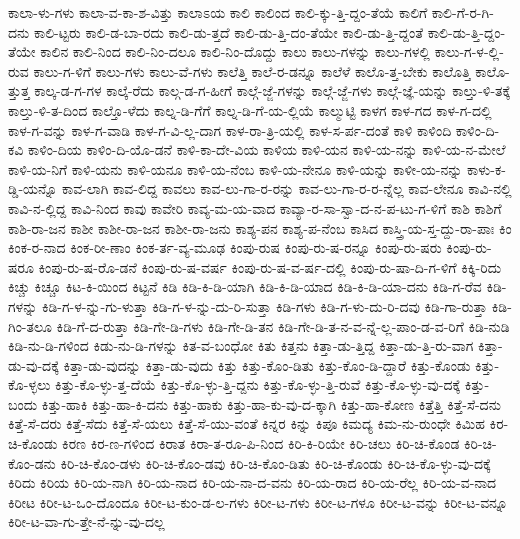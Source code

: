 {ಕಾಲಾ-ಳು-ಗಳು
ಕಾಲಾ-ವ-ಕಾ-ಶ-ವಿತ್ತು
ಕಾಲಾಽಯ
ಕಾಲಿ
ಕಾಲಿಂದ
ಕಾಲಿ-ಕ್ಕು-ತ್ತಿ-ದ್ದಂ-ತೆಯೆ
ಕಾಲಿಗೆ
ಕಾಲಿ-ಗೆ-ರ-ಗಿ-ದನು
ಕಾಲಿ-ಟ್ಟರು
ಕಾಲಿ-ಡ-ಬಾ-ರದು
ಕಾಲಿ-ಡು-ತ್ತದೆ
ಕಾಲಿ-ಡು-ತ್ತಿ-ದಂ-ತೆಯೇ
ಕಾಲಿ-ಡು-ತ್ತಿ-ದ್ದಂತೆ
ಕಾಲಿ-ಡು-ತ್ತಿ-ದ್ದಂ-ತೆಯೇ
ಕಾಲಿನ
ಕಾಲಿ-ನಿಂದ
ಕಾಲಿ-ನಿಂ-ದಲೂ
ಕಾಲಿ-ನಿಂ-ದೊದ್ದು
ಕಾಲು
ಕಾಲು-ಗಳನ್ನು
ಕಾಲು-ಗಳಲ್ಲಿ
ಕಾಲು-ಗ-ಳ-ಲ್ಲಿ-ರುವ
ಕಾಲು-ಗ-ಳಿಗೆ
ಕಾಲು-ಗಳು
ಕಾಲು-ವೆ-ಗಳು
ಕಾಲೆತ್ತಿ
ಕಾಲೆ-ರ-ಡನ್ನೂ
ಕಾಲೆಳೆ
ಕಾಲೊ-ತ್ತ-ಬೇಕು
ಕಾಲೊತ್ತಿ
ಕಾಲೊ-ತ್ತುತ್ತ
ಕಾಲ್ಕ-ಡ-ಗ-ಗಳ
ಕಾಲ್ಕೆ-ರೆದು
ಕಾಲ್ಗ-ಡ-ಗ-ಹೀಗೆ
ಕಾಲ್ಗೆ-ಜ್ಜೆ-ಗಳನ್ನು
ಕಾಲ್ಗೆ-ಜ್ಜೆ-ಗಳು
ಕಾಲ್ಗೆ-ಜ್ಞೆ-ಯನ್ನು
ಕಾಲ್ತು-ಳಿ-ತಕ್ಕೆ
ಕಾಲ್ತು-ಳಿ-ತ-ದಿಂದ
ಕಾಲ್ತೊ-ಳೆದು
ಕಾಲ್ನ-ಡಿ-ಗೆಗೆ
ಕಾಲ್ನ-ಡಿ-ಗೆ-ಯ-ಲ್ಲಿಯೆ
ಕಾಲ್ಮುಟ್ಟಿ
ಕಾಳಗ
ಕಾಳ-ಗದ
ಕಾಳ-ಗ-ದಲ್ಲಿ
ಕಾಳ-ಗ-ವನ್ನು
ಕಾಳ-ಗ-ವಾಡಿ
ಕಾಳ-ಗ-ವಿ-ಲ್ಲ-ದಾಗ
ಕಾಳ-ರಾ-ತ್ರಿ-ಯಲ್ಲಿ
ಕಾಳ-ಸ-ರ್ಪ-ದಂತೆ
ಕಾಳಿ
ಕಾಳಿಂದಿ
ಕಾಳಿಂ-ದಿ-ಕವಿ
ಕಾಳಿಂ-ದಿಯ
ಕಾಳಿಂ-ದಿ-ಯೊ-ಡನೆ
ಕಾಳಿ-ಕಾ-ದೇ-ವಿಯ
ಕಾಳಿಯ
ಕಾಳಿ-ಯನ
ಕಾಳಿ-ಯ-ನನ್ನು
ಕಾಳಿ-ಯ-ನ-ಮೇಲೆ
ಕಾಳಿ-ಯ-ನಿಗೆ
ಕಾಳಿ-ಯನು
ಕಾಳಿ-ಯನೂ
ಕಾಳಿ-ಯ-ನೆಂಬ
ಕಾಳಿ-ಯ-ನೇನೂ
ಕಾಳಿ-ಯನ್ನು
ಕಾಳೀ-ಯ-ನನ್ನು
ಕಾಳು-ಕ-ಡ್ಡಿ-ಯನ್ನೊ
ಕಾವ-ಲಾಗಿ
ಕಾವ-ಲಿದ್ದ
ಕಾವಲು
ಕಾವ-ಲು-ಗಾ-ರ-ರನ್ನು
ಕಾವ-ಲು-ಗಾ-ರ-ರ-ನ್ನೆಲ್ಲ
ಕಾವ-ಲೇನೂ
ಕಾವಿ-ನಲ್ಲಿ
ಕಾವಿ-ನ-ಲ್ಲಿದ್ದ
ಕಾವಿ-ನಿಂದ
ಕಾವು
ಕಾವೇರಿ
ಕಾವ್ಯ-ಮ-ಯ-ವಾದ
ಕಾವ್ಯಾ-ರ-ಸಾ-ಸ್ವಾ-ದ-ನ-ಪ-ಟು-ಗ-ಳಿಗೆ
ಕಾಶಿ
ಕಾಶಿಗೆ
ಕಾಶಿ-ರಾ-ಜನ
ಕಾಶೀ
ಕಾಶೀ-ರಾ-ಜನ
ಕಾಶೀ-ರಾ-ಜನು
ಕಾಶ್ಯ-ಪನ
ಕಾಶ್ಯ-ಪ-ನೆಂಬ
ಕಾಸಿದ
ಕಾಸ್ತ್ರಿ-ಯ-ಸ್ತ-ದ್ದು-ರಾ-ಪಾಃ
ಕಿಂ
ಕಿಂಕ-ರ-ನಾದ
ಕಿಂಕ-ರೀ-ಣಾಂ
ಕಿಂಕ-ರ್ತ-ವ್ಯ-ಮೂಢ
ಕಿಂಪು-ರುಷ
ಕಿಂಪು-ರು-ಷ-ರನ್ನೂ
ಕಿಂಪು-ರು-ಷರು
ಕಿಂಪು-ರು-ಷರೂ
ಕಿಂಪು-ರು-ಷ-ರೊ-ಡನೆ
ಕಿಂಪು-ರು-ಷ-ವರ್ಷ
ಕಿಂಪು-ರು-ಷ-ವ-ರ್ಷ-ದಲ್ಲಿ
ಕಿಂಪು-ರು-ಷಾ-ದಿ-ಗ-ಳಿಗೆ
ಕಿಕ್ಕಿ-ರಿದು
ಕಿಚ್ಚು
ಕಿಚ್ಚೂ
ಕಿಟ-ಕಿ-ಯಿಂದ
ಕಿಟ್ಟನೆ
ಕಿಡಿ
ಕಿಡಿ-ಕಿ-ಡಿ-ಯಾಗಿ
ಕಿಡಿ-ಕಿ-ಡಿ-ಯಾದ
ಕಿಡಿ-ಕಿ-ಡಿ-ಯಾ-ದನು
ಕಿಡಿ-ಗ-ರೆವ
ಕಿಡಿ-ಗಳನ್ನು
ಕಿಡಿ-ಗ-ಳ-ನ್ನು-ಗು-ಳುತ್ತಾ
ಕಿಡಿ-ಗ-ಳ-ನ್ನು-ದು-ರಿ-ಸುತ್ತಾ
ಕಿಡಿ-ಗಳು
ಕಿಡಿ-ಗ-ಳು-ದು-ರಿ-ದವು
ಕಿಡಿ-ಗಾ-ರುತ್ತಾ
ಕಿಡಿ-ಗಿಂ-ತಲೂ
ಕಿಡಿ-ಗೆ-ದ-ರುತ್ತಾ
ಕಿಡಿ-ಗೇ-ಡಿ-ಗಳು
ಕಿಡಿ-ಗೇ-ಡಿ-ತನ
ಕಿಡಿ-ಗೇ-ಡಿ-ತ-ನ-ವ-ನ್ನೆ-ಲ್ಲ-ಪಾಂ-ಡ-ವ-ರಿಗೆ
ಕಿಡಿ-ನುಡಿ
ಕಿಡಿ-ನು-ಡಿ-ಗಳಿಂದ
ಕಿಡು-ನು-ಡಿ-ಗಳನ್ನು
ಕಿತ-ವ-ಬಂಧೋ
ಕಿತು
ಕಿತ್ತನು
ಕಿತ್ತಾ-ಡು-ತ್ತಿದ್ದ
ಕಿತ್ತಾ-ಡು-ತ್ತಿ-ರು-ವಾಗ
ಕಿತ್ತಾ-ಡು-ವು-ದಕ್ಕೆ
ಕಿತ್ತಾ-ಡು-ವುದನ್ನು
ಕಿತ್ತಾ-ಡು-ವುದು
ಕಿತ್ತು
ಕಿತ್ತು-ಕೊಂ-ಡಿತು
ಕಿತ್ತು-ಕೊಂ-ಡಿ-ದ್ದಾರೆ
ಕಿತ್ತು-ಕೊಂಡು
ಕಿತ್ತು-ಕೊ-ಳ್ಳಲು
ಕಿತ್ತು-ಕೊ-ಳ್ಳು-ತ್ತ-ದೆಯೆ
ಕಿತ್ತು-ಕೊ-ಳ್ಳು-ತ್ತಿ-ದ್ದನು
ಕಿತ್ತು-ಕೊ-ಳ್ಳು-ತ್ತಿ-ರುವೆ
ಕಿತ್ತು-ಕೊ-ಳ್ಳು-ವು-ದಕ್ಕೆ
ಕಿತ್ತು-ಬಂದು
ಕಿತ್ತು-ಹಾಕಿ
ಕಿತ್ತು-ಹಾ-ಕಿ-ದನು
ಕಿತ್ತು-ಹಾಕು
ಕಿತ್ತು-ಹಾ-ಕು-ವು-ದ-ಕ್ಕಾಗಿ
ಕಿತ್ತು-ಹಾ-ಕೋಣ
ಕಿತ್ತೆತ್ತಿ
ಕಿತ್ತೆ-ಸೆ-ದನು
ಕಿತ್ತೆ-ಸೆ-ದರು
ಕಿತ್ತೆ-ಸೆದು
ಕಿತ್ತೆ-ಸೆ-ಯಲು
ಕಿತ್ತೆ-ಸೆ-ಯು-ವಂತೆ
ಕಿನ್ನರ
ಕಿನ್ನು
ಕಿಪೂ
ಕಿಮದ್ಯ
ಕಿಮ-ನು-ರುಂಧೇ
ಕಿಮಿಹ
ಕಿರ-ಚಿ-ಕೊಂಡು
ಕಿರಣ
ಕಿರ-ಣ-ಗಳಿಂದ
ಕಿರಾತ
ಕಿರಾ-ತ-ರೂ-ಪಿ-ನಿಂದ
ಕಿರಿ-ಕಿ-ರಿಯೇ
ಕಿರಿ-ಚಲು
ಕಿರಿ-ಚಿ-ಕೊಂಡ
ಕಿರಿ-ಚಿ-ಕೊಂ-ಡನು
ಕಿರಿ-ಚಿ-ಕೊಂ-ಡಳು
ಕಿರಿ-ಚಿ-ಕೊಂ-ಡವು
ಕಿರಿ-ಚಿ-ಕೊಂ-ಡಿತು
ಕಿರಿ-ಚಿ-ಕೊಂಡು
ಕಿರಿ-ಚಿ-ಕೊ-ಳ್ಳು-ವು-ದಕ್ಕೆ
ಕಿರಿದು
ಕಿರಿಯ
ಕಿರಿ-ಯ-ನಾಗಿ
ಕಿರಿ-ಯ-ನಾದ
ಕಿರಿ-ಯ-ನಾ-ದ-ವನು
ಕಿರಿ-ಯ-ರಾದ
ಕಿರಿ-ಯ-ರೆಲ್ಲ
ಕಿರಿ-ಯ-ವ-ನಾದ
ಕಿರೀಟ
ಕಿರೀ-ಟ-ಒಂ-ದೊಂದೂ
ಕಿರೀ-ಟ-ಕುಂ-ಡ-ಲ-ಗಳು
ಕಿರೀ-ಟ-ಗಳು
ಕಿರೀ-ಟ-ಗಳೂ
ಕಿರೀ-ಟ-ವನ್ನು
ಕಿರೀ-ಟ-ವನ್ನೂ
ಕಿರೀ-ಟ-ವಾ-ಗು-ತ್ತೇ-ನೆ-ನ್ನು-ವು-ದಲ್ಲ
}
